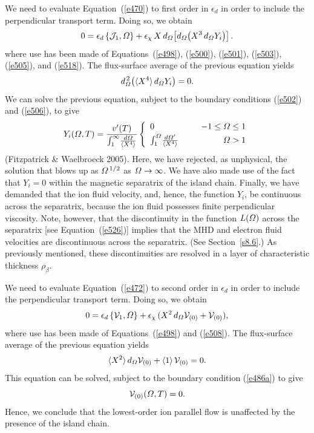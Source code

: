\documentclass[notitlepage,12pt]{article}
\begin{document}
We need to evaluate Equation~(\ref{e470}) to first order in $\epsilon_d$ in order to include the perpendicular transport term. Doing so,
we obtain
\begin{equation}\label{e528a}
0 =\epsilon_d\,\{{\cal J}_1,{\mit\Omega}\} +\epsilon_\chi\,X\,d_{{\mit\Omega}}\!\left[d_{\mit\Omega}\!\left(X^3\,d_{\mit\Omega} Y_i\right)\right].
\end{equation}
where use has been made of Equations~(\ref{e498}), (\ref{e500}), (\ref{e501}), (\ref{e503}), (\ref{e505}), and (\ref{e518}). The flux-surface average of the previous equation yields 
\begin{equation}
d_{\mit\Omega}^{\,2}\!\left(\langle X^4\rangle\,d_{\mit\Omega} Y_i\right)= 0.
\end{equation}
We can solve the previous equation, subject to the boundary conditions (\ref{e502}) and (\ref{e506}), to give
\begin{equation}\label{e530}
Y_i({\mit\Omega},T)=\frac{v'(T)}{\int_1^\infty \!\frac{d{\mit\Omega}}{\langle X^4\rangle}}\left\{
\begin{array}{llr}
0&&-1\leq {\mit\Omega}\leq 1\\[0.5ex]
\int_1^{\mit\Omega}\! \frac{d{\mit\Omega}'}{\langle X^4\rangle}&~~&{\mit\Omega}>1
\end{array}\right.
\end{equation}
(Fitzpatrick \& Waelbroeck 2005).
Here, we have rejected, as unphysical, the solution that blows up as ${\mit\Omega}^{\,1/2}$ as ${\mit\Omega}\rightarrow\infty$. 
We have also made use of the fact that $Y_i=0$ within the magnetic separatrix of the island chain. Finally, we have  demanded that the ion
fluid velocity, and, hence, the function $Y_i$,  be continuous across the separatrix, because the ion fluid possesses finite perpendicular viscosity. 
Note, however, that the discontinuity in the function $L({\mit\Omega})$ across the separatrix [see Equation~(\ref{e526})] implies that the
MHD and electron fluid velocities are  discontinuous across the separatrix. (See Section~\ref{s8.6}.) As previously
mentioned, these discontinuities are resolved in a layer of characteristic thickness $\rho_\beta$. 

We need to evaluate Equation~(\ref{e472}) to second order in $\epsilon_d$ in order to include the perpendicular transport term. Doing so,
we obtain
\begin{equation}
0=\epsilon_d\,\{{\cal V}_1,{\mit\Omega}\} + \epsilon_\chi\,(X^2\,d_{\mit\Omega} {\cal V}_{(0)} + {\cal V}_{(0)}),
\end{equation}
where use has been made of Equations~(\ref{e498}) and (\ref{e508}). The flux-surface average of the
previous equation yields
\begin{equation}
\langle X^2\rangle\,d_{\mit\Omega} {\cal V}_{(0)} +\langle 1\rangle \,{\cal V}_{(0)}= 0.
\end{equation}
 This equation can be solved, subject to the boundary condition (\ref{e486a}) to
give
\begin{equation}
{\cal V}_{(0)}({\mit\Omega}, T) = 0.
\end{equation}
Hence, we conclude that the lowest-order ion parallel flow is unaffected by the presence of the island chain. 
\end{document}
